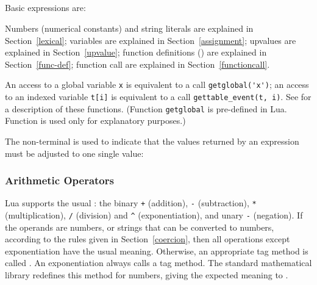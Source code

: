 \subsection{}

\subsubsection{}
Basic expressions are:
\begin{Produc}
\end{Produc}%
\begin{Produc}
\end{Produc}%

Numbers (numerical constants) and
string literals are explained in Section~\ref{lexical};
variables are explained in Section~\ref{assignment};
upvalues are explained in Section~\ref{upvalue};
function definitions () are explained in Section~\ref{func-def};
function call are explained in Section~\ref{functioncall}.

An access to a global variable \verb|x| is equivalent to a
call \verb|getglobal('x')|;
an access to an indexed variable \verb|t[i]| is equivalent to
a call \verb|gettable_event(t, i)|.
See  for a description of these functions.
(Function \verb|getglobal| is pre-defined in Lua.
Function  is used only for explanatory purposes.)

The non-terminal  is used to indicate that the values
returned by an expression must be adjusted to one single value:
\begin{Produc}
\end{Produc}

\subsubsection{Arithmetic Operators}
Lua supports the usual :
the binary \verb|+| (addition),
\verb|-| (subtraction), \verb|*| (multiplication),
\verb|/| (division) and \verb|^| (exponentiation),
and unary \verb|-| (negation).
If the operands are numbers, or strings that can be converted to
numbers, according to the rules given in Section~\ref{coercion},
then all operations except exponentiation have the usual meaning.
Otherwise, an appropriate tag method is called .
An exponentiation always calls a tag method.
The standard mathematical library redefines this method for numbers,
giving the expected meaning to 
.

